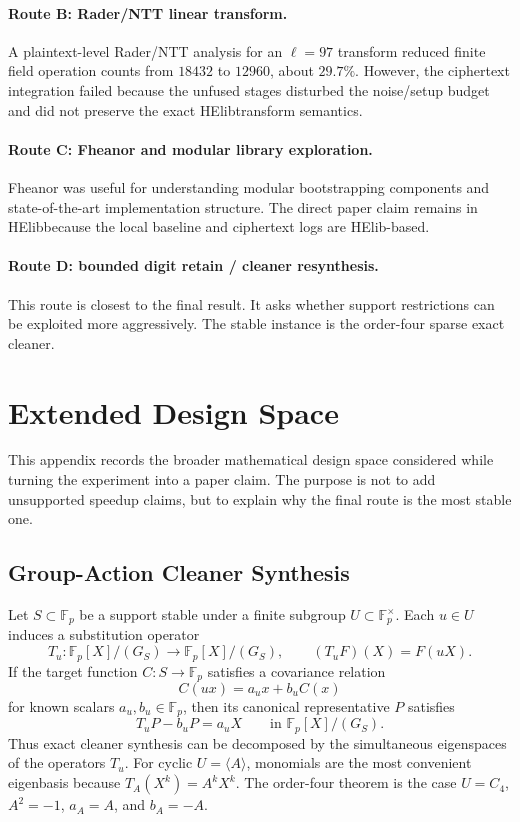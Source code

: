 \documentclass[a4paper,runningheads]{llncs}
\newcommand{\Fp}{\mathbb{F}_p}
\newcommand{\HElib}{\textsf{HElib}}
\begin{document}
\paragraph{Route B: Rader/NTT linear transform.}
A plaintext-level Rader/NTT analysis for an $\ell=97$ transform reduced finite
field operation counts from $18432$ to $12960$, about $29.7\%$.  However, the
ciphertext integration failed because the unfused stages disturbed the
noise/setup budget and did not preserve the exact \HElib transform semantics.

\paragraph{Route C: Fheanor and modular library exploration.}
Fheanor was useful for understanding modular bootstrapping components and
state-of-the-art implementation structure.  The direct paper claim remains in
\HElib because the local baseline and ciphertext logs are \HElib-based.

\paragraph{Route D: bounded digit retain / cleaner resynthesis.}
This route is closest to the final result.  It asks whether support
restrictions can be exploited more aggressively.  The stable instance is the
order-four sparse exact cleaner.

\section{Extended Design Space}
\label{app:design-space}

This appendix records the broader mathematical design space considered while
turning the experiment into a paper claim.  The purpose is not to add
unsupported speedup claims, but to explain why the final route is the most
stable one.

\subsection{Group-Action Cleaner Synthesis}

Let $S\subset\Fp$ be a support stable under a finite subgroup
$U\subset\Fp^\times$.  Each $u\in U$ induces a substitution operator
\[
  T_u:\Fp[X]/(G_S)\to\Fp[X]/(G_S),\qquad (T_uF)(X)=F(uX).
\]
If the target function $C:S\to\Fp$ satisfies a covariance relation
\[
  C(ux)=a_u x+b_u C(x)
\]
for known scalars $a_u,b_u\in\Fp$, then its canonical representative $P$
satisfies
\[
  T_uP-b_uP=a_uX\qquad\text{in }\Fp[X]/(G_S).
\]
Thus exact cleaner synthesis can be decomposed by the simultaneous eigenspaces
of the operators $T_u$.  For cyclic $U=\langle A\rangle$, monomials are the
most convenient eigenbasis because $T_A(X^k)=A^kX^k$.  The order-four theorem
is the case $U=C_4$, $A^2=-1$, $a_A=A$, and $b_A=-A$.
\end{document}
